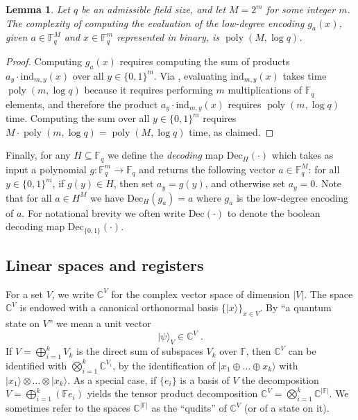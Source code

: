 \documentclass[11pt]{article}
\newtheorem{lemma}[theorem]{Lemma}
\theoremstyle{definition}
\newcommand{\ket}[1]{|#1\rangle}
\newcommand{\C}{\ensuremath{\mathbb{C}}}
\newcommand{\complex}{\ensuremath{\mathbb{C}}}
\newcommand{\F}{\ensuremath{\mathbb{F}}}
\newcommand{\ind}{\ensuremath{\mathrm{ind}}}
\DeclareMathOperator{\poly}{poly}
\newcommand{\abs}[1]{\left\vert {#1} \right\vert}
\newcommand{\coded}{\mathrm{Dec}}
\begin{document}
\begin{lemma}
\label{lem:ld-encoding-complexity}
Let $q$ be an admissible field size, and let $M = 2^m$ for some integer $m$.
The complexity of computing the evaluation of the low-degree encoding $g_a(x)$,
given $a \in \F_q^M$ and $x \in \F_q^m$ represented in binary, is $\poly(M,\log
q)$.
\end{lemma}
\begin{proof}
	Computing $g_a(x)$ requires computing the sum of products $a_y \cdot
  \ind_{m,y}(x)$ over all $y \in \{0,1\}^m$.
  Via , evaluating $\ind_{m,y}(x)$ takes time
  $\poly(m,\log q)$ because it requires performing $m$ multiplications of $\F_q$
  elements, and therefore the product $a_y \cdot \ind_{m,y}(x)$ requires
  $\poly(m,\log q)$ time.
  Computing the sum over all $y \in \{0,1\}^m$ requires $M \cdot \poly(m,\log q)
  = \poly(M,\log q)$ time, as claimed.
\end{proof}

Finally, for any $H \subseteq \F_q$ we define the \emph{decoding} map
$\coded_H(\cdot)$ which takes as input a polynomial $g : \F_q^m \to \F_q$ and
returns the following vector $a \in \F_q^M$: for all $y \in \{0,1\}^m$, if $g(y)
\in H$, then set $a_y = g(y)$, and otherwise set $a_y = 0$.
Note that for all $a \in H^M$ we have $\coded_H(g_a) = a$ where $g_a$ is the
low-degree encoding of $a$.
For notational brevity we often write $\coded(\cdot)$ to denote the boolean
decoding map $\coded_{\{0,1\}}(\cdot)$.

\subsection{Linear spaces and registers}
\label{sec:lin-reg}

For a set $V$, we write $\C^V$ for the complex vector space of dimension $|V|$.
The space $\C^V$ is endowed with a canonical orthonormal basis
$\{\ket{x}\}_{x\in V}$.
By ``a quantum state on $V$'' we mean a unit vector
\begin{equation*}
  \ket{\psi}_V \in \complex^V\;.
\end{equation*}
If $V = \bigoplus_{i=1}^k V_k$ is the direct sum of subspaces $V_k$ over $\F$,
then $\complex^V$ can be identified with $\bigotimes_{i=1}^k
\complex^{V_i}$, by the identification of $\ket{x_1 \oplus \dots \oplus
  x_k}$ with $\ket{x_1} \otimes \dots \otimes \ket{x_k}$.
As a special case, if $\{e_i\}$ is a basis of $V$ the decomposition $V =
\bigoplus_{i=1}^k ( \F e_i)$ yields the tensor product decomposition $\C^V =
\bigotimes_{i=1}^k \C^{\abs{\F}}$.
We sometimes refer to the spaces $\C^{\abs{\F}}$ as the ``qudits'' of $\C^V$ (or
of a state on it).
\end{document}
